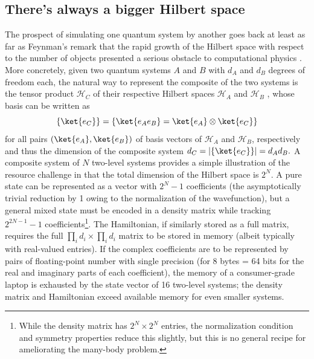 	

\subsection{There's always a bigger Hilbert space}


	The prospect of simulating one quantum system by another goes back at least as far as Feynman's remark  that the rapid growth of the Hilbert space with respect to the number of objects presented a serious obstacle to computational physics \cite{Feynman82}.
	More concretely, given two quantum systems $A$ and $B$ with $d_A$ and $d_B$ degrees of freedom each, the natural way to represent the composite of the two systems is the tensor product $\mathcal{H}_C$ of their respective Hilbert spaces $\mathcal{H}_A$ and $\mathcal{H}_B$ \cite{Carcassi21}, whose basis can be written as
	\begin{equation}
	\{\ket{e_C}\} = \{\ket{e_A e_B}=\ket{e_A}\otimes\ket{e_C}\}
	\end{equation}
	for all pairs $(\ket{e_A},\ket{e_B})$ of basis vectors of $\mathcal{H}_A$ and $\mathcal{H}_B$, respectively and thus the dimension of the composite system $d_C = |\{\ket{e_C}\}| = d_A d_B.$ A composite system of $N$ two-level systems provides a simple illustration of the resource challenge in that the total dimension of the Hilbert space is $2^N$.
	A pure state can be represented as a vector with $2^N-1$ coefficients (the asymptotically trivial reduction by 1 owing to the normalization of the wavefunction), but a general mixed state must be encoded in a density matrix while tracking $2^{2N-1}-1$  coefficients\footnote{While the density matrix has $2^N\times2^N$ entries, the normalization condition and symmetry properties reduce this slightly, but this is no general recipe for ameliorating the many-body problem.}.
	The Hamiltonian, if similarly stored as a full matrix, requires the full $\prod_i d_i\times\prod_i d_i$ matrix to be stored in memory (albeit typically with real-valued entries).
	If the complex coefficients are to be represented by pairs of floating-point number with single precision (for 8 bytes = 64 bits for the real and imaginary parts of each coefficient), the memory of a consumer-grade laptop is exhausted by the state vector of 16 two-level systems; the density matrix and Hamiltonian exceed available memory for even smaller systems.

